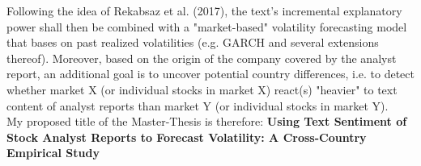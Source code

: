 \documentclass[12pt, a4paper]{article}
\begin{document}
Following the idea of Rekabsaz et al. (2017), the text's incremental explanatory power shall then be combined with a "market-based" volatility forecasting model that bases on past realized volatilities (e.g. GARCH and several extensions thereof). Moreover, based on the origin of the company covered by the analyst report, an additional goal is to uncover potential country differences, i.e. to detect whether market X (or individual stocks in market X) react(s) "heavier" to text content of analyst reports than market Y (or individual stocks in market Y).
\\ \newline
My proposed title of the Master-Thesis is therefore: \newline
\textbf{Using Text Sentiment of Stock Analyst Reports to Forecast Volatility: A Cross-Country Empirical Study}
\end{document}

